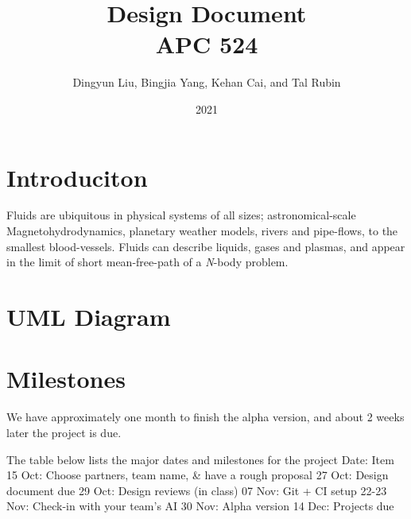 \documentclass[aip, amsmath, amssymb, preprint,floatfix]{revtex4-2}
\begin{document}
\title{Design Document\\APC 524}
\date{2021}

\author{Dingyun Liu, Bingjia Yang, Kehan Cai, and Tal Rubin}
\maketitle

\section{Introduciton}

Fluids are ubiquitous in physical systems of all sizes; astronomical-scale Magnetohydrodynamics, planetary weather models, rivers and pipe-flows, to the smallest blood-vessels. Fluids can describe liquids, gases and plasmas, and appear in the limit of short mean-free-path of a \textit{N}-body problem.


\section{UML Diagram}

\section{Milestones}

We have approximately one month to finish the alpha version, and about 2 weeks later the project is due.

The table below lists the major dates and milestones for the project 
Date: Item
15 Oct: Choose partners, team name, & have a rough proposal 
27 Oct: Design document due
29 Oct: Design reviews (in class)
07 Nov: Git + CI setup
22-23 Nov: Check-in with your team’s AI
30 Nov: Alpha version
14 Dec: Projects due
\end{document}
